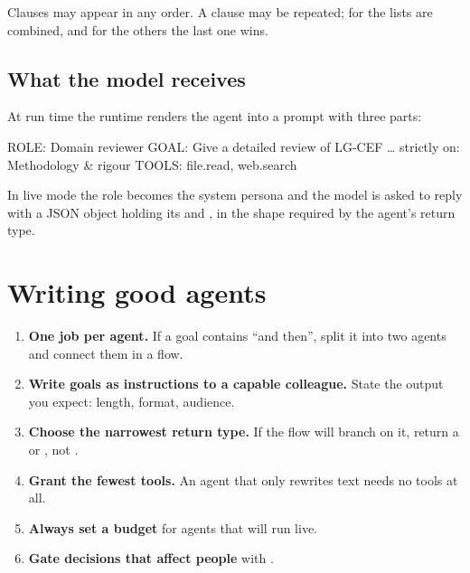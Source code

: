 Clauses may appear in any order. A clause may be repeated; for  the lists are combined, and for the others the last one wins.

\subsection{What the model receives}

At run time the runtime renders the agent into a prompt with three parts:

\begin{plaincode}[title=rendered prompt]
ROLE: Domain reviewer
GOAL: Give a detailed review of LG-CEF … strictly on: Methodology & rigour
TOOLS: file.read, web.search
\end{plaincode}

In live mode the role becomes the system persona and the model is asked to reply with a JSON object holding its  and , in the shape required by the agent's return type.

\section{Writing good agents}

\begin{enumerate}
  \item \textbf{One job per agent.} If a goal contains ``and then'', split it into two agents and connect them in a flow.
  \item \textbf{Write goals as instructions to a capable colleague.} State the output you expect: length, format, audience.
  \item \textbf{Choose the narrowest return type.} If the flow will branch on it, return a  or , not .
  \item \textbf{Grant the fewest tools.} An agent that only rewrites text needs no tools at all.
  \item \textbf{Always set a budget} for agents that will run live.
  \item \textbf{Gate decisions that affect people} with .
\end{enumerate}
